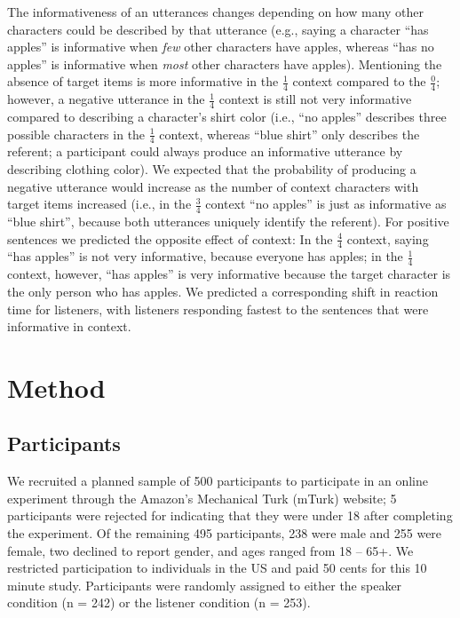 \documentclass[man, floatsintext, noapacite]{apa6}
\begin{document}
The informativeness of an utterances changes depending on how many other characters could be described by that utterance (e.g., saying a character ``has apples'' is informative when \textit{few} other characters have apples, whereas ``has no apples'' is informative when \textit{most} other characters have apples). Mentioning the absence of target items is more informative in the $\frac{1}{4}$  context compared to the $\frac{0}{4}$;  however, a negative utterance in the $\frac{1}{4}$ context is still not very informative compared to describing a character's shirt color (i.e., ``no apples'' describes three possible characters in the $\frac{1}{4}$ context, whereas ``blue shirt'' only describes the referent; a participant could always produce an informative utterance by describing clothing color). We expected that the probability of producing a negative utterance would increase as the number of context characters with target items increased (i.e., in the $\frac{3}{4}$ context ``no apples'' is just as informative as ``blue shirt'', because both utterances uniquely identify the referent). For positive sentences we predicted the opposite effect of context: In the $\frac{4}{4}$ context, saying ``has apples'' is not very informative, because everyone has apples; in the $\frac{1}{4}$ context, however, ``has apples'' is very informative because the target character is the only person who has apples. We predicted a corresponding shift in reaction time for listeners, with listeners responding fastest to the sentences that were informative in context. 

\section{Method}

\subsection{Participants} 

We recruited a planned sample of 500 participants to participate in an online experiment through the Amazon's Mechanical Turk (mTurk) website; 5 participants were rejected for indicating that they were under 18 after completing the experiment.  Of the remaining 495 participants, 238 were male and 255 were female, two declined to report gender, and ages ranged from 18 -- 65+.  We restricted participation to individuals in the US and paid 50 cents for this 10 minute study.  Participants were randomly assigned to either the speaker condition (n = 242) or the listener condition (n = 253).
\end{document}
